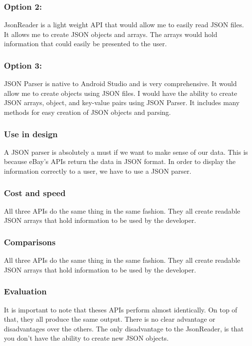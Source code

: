 \documentclass[journal,compsoc, 10pt, draftclsnofoot, onecolumn]{IEEEtran}
\begin{document}
\subsubsection*{Option 2: }
JsonReader is a light weight API that would allow me to easily read JSON files.
It allows me to create JSON objects and arrays. The arrays would hold
information that could easily be presented to the user.

\subsubsection*{Option 3: }
JSON Parser is native to Android Studio and is very comprehensive. It would
allow me to create objects using JSON files. I would have the ability to create
JSON arrays, object, and key-value pairs using JSON Parser. It includes many
methods for easy creation of JSON objects and parsing.

\subsubsection{Use in design}
A JSON parser is absolutely a must if we want to make sense of our data. This is
because eBay's APIs return the data in JSON format. In order to display the
information correctly to a user, we have to use a JSON parser.

\subsubsection{Cost and speed}
All three APIs do the same thing in the same fashion. They all create readable
JSON arrays that hold information to be used by the developer.

\subsubsection{Comparisons}
All three APIs do the same thing in the same fashion. They all create readable
JSON arrays that hold information to be used by the developer.

\subsubsection{Evaluation}
It is important to note that theses APIs perform almost identically. On top of
that, they all produce the same output. There is no clear advantage or
disadvantages over the others. The only disadvantage to the JsonReader, is that
you don't have the ability to create new JSON objects.
\end{document}
